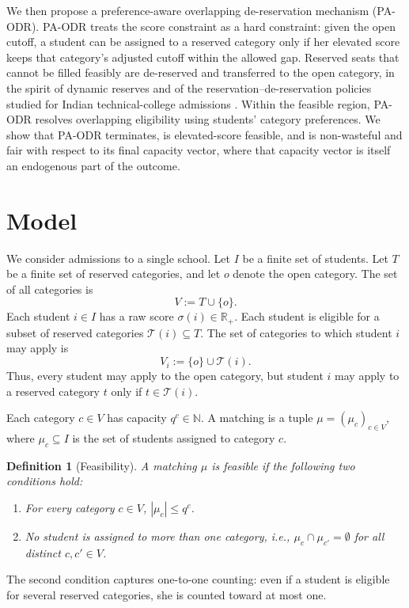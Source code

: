 \documentclass[10pt]{article}
\newtheorem{definition}{Definition}
\newcommand{\T}{\mathcal{T}}
\newcommand{\R}{\mathbb{R}}
\newcommand{\1}{\mathbf{1}}
\begin{document}
We then propose a preference-aware overlapping de-reservation mechanism (PA-ODR). PA-ODR treats the score constraint as a hard constraint: given the open cutoff, a student can be assigned to a reserved category only if her elevated score keeps that category's adjusted cutoff within the allowed gap. Reserved seats that cannot be filled feasibly are de-reserved and transferred to the open category, in the spirit of dynamic reserves \citep{AyTu20a} and of the reservation--de-reservation policies studied for Indian technical-college admissions \citep{AyTu23a}. Within the feasible region, PA-ODR resolves overlapping eligibility using students' category preferences. We show that PA-ODR terminates, is elevated-score feasible, and is non-wasteful and fair with respect to its final capacity vector, where that capacity vector is itself an endogenous part of the outcome.

\section{Model}

We consider admissions to a single school. Let $I$ be a finite set of students. Let $T$ be a finite set of reserved categories, and let $o$ denote the open category. The set of all categories is
\[
V := T \cup \{o\}.
\]
Each student $i\in I$ has a raw score $\sigma(i)\in\R_+$. Each student is eligible for a subset of reserved categories $\T(i)\subseteq T$. The set of categories to which student $i$ may apply is
\[
V_i := \{o\}\cup \T(i).
\]
Thus, every student may apply to the open category, but student $i$ may apply to a reserved category $t$ only if $t\in\T(i)$.

Each category $c\in V$ has capacity $q^c\in\mathbb{N}$. A matching is a tuple $\mu=(\mu_c)_{c\in V}$, where $\mu_c\subseteq I$ is the set of students assigned to category $c$.

\begin{definition}[Feasibility]
A matching $\mu$ is feasible if the following two conditions hold:
\begin{enumerate}
\item For every category $c\in V$, $|\mu_c|\le q^c$.
\item No student is assigned to more than one category, i.e., $\mu_c\cap \mu_{c'}=\emptyset$ for all distinct $c,c'\in V$.
\end{enumerate}
\end{definition}

The second condition captures one-to-one counting: even if a student is eligible for several reserved categories, she is counted toward at most one.
\end{document}
